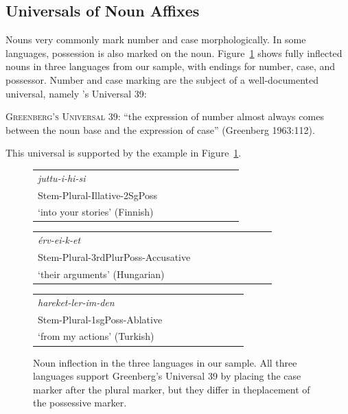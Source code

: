 \documentclass[11pt,letterpaper]{article}
\newcommand{\citet}{\Textcite}
\newcommand\mhahn[1]{{\color{red}(#1)}}
\begin{document}
\subsection{Universals of Noun Affixes}\label{sec:univ-nouns}
Nouns very commonly mark number and case morphologically.
In some languages, possession is also marked on the noun.
Figure~\ref{fig:noun-inflection} shows fully inflected nouns in three languages from our sample, with endings for number, case, and possessor.
Number and case marking are the subject of a well-documented universal, namely \citet{greenberg1963universals}'s Universal 39:

\begin{adjustwidth}{6em}{6em}
\textsc{Greenberg's Universal 39}:
``the expression of number almost always comes between the noun base and the expression of case'' (Greenberg 1963:112).
\end{adjustwidth}
This universal is supported by the example in Figure~\ref{fig:noun-inflection}.



\begin{figure}
\begin{tabular}{lllllllll}
\textit{juttu-i-hi-si} \\
Stem-Plural-Illative-2SgPoss \\
`into your stories' (Finnish)
\end{tabular}
\begin{tabular}{lllllllll}
	\textit{{\'e}rv-ei-k-et} \\
Stem-Plural-3rdPlurPoss-Accusative \\
`their arguments' (Hungarian)
\end{tabular}
\begin{tabular}{lllllllll}
\textit{hareket-ler-im-den} \\
Stem-Plural-1sgPoss-Ablative\\
`from my actions' (Turkish) \\
\end{tabular}


\caption{Noun inflection in the three languages in our sample. All three languages support Greenberg's Universal 39 by placing the case marker after the plural marker, but they differ in theplacement of the possessive marker.}\label{fig:noun-inflection}
\end{figure}
\end{document}
